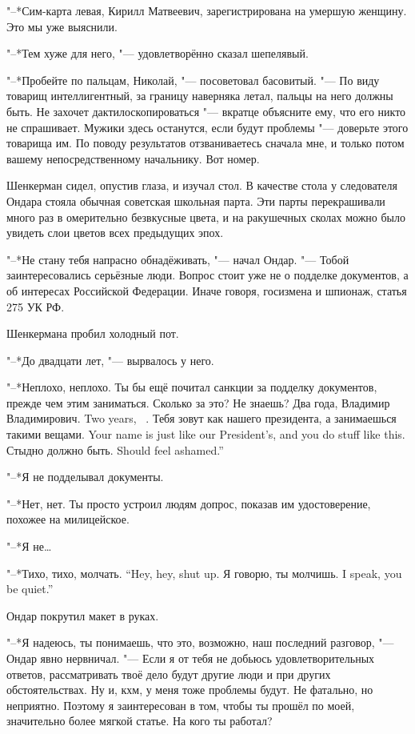 "--*Сим-карта левая, Кирилл Матвеевич, зарегистрирована на умершую женщину.
Это мы уже выяснили.

"--*Тем хуже для него, "--- удовлетворённо сказал шепелявый.

"--*Пробейте по пальцам, Николай, "--- посоветовал басовитый.
"--- По виду товарищ интеллигентный, за границу наверняка летал, пальцы на него должны быть.
Не захочет дактилоскопироваться "--- вкратце объясните ему, что его никто не спрашивает.
Мужики здесь останутся, если будут проблемы "--- доверьте этого товарища им.
По поводу результатов отзваниваетесь сначала мне, и только потом вашему непосредственному начальнику.
Вот номер.

\asterism

Шенкерман сидел, опустив глаза, и изучал стол.
В качестве стола у следователя Ондара стояла обычная советская школьная парта.
Эти парты перекрашивали много раз в омерительно безвкусные цвета, и на ракушечных сколах можно было увидеть слои цветов всех предыдущих эпох.

"--*Не стану тебя напрасно обнадёживать, "--- начал Ондар.
"--- Тобой заинтересовались серьёзные люди.
Вопрос стоит уже не о подделке документов, а об интересах Российской Федерации.
Иначе говоря, госизмена и шпионаж, статья 275 УК РФ.

Шенкермана пробил холодный пот.

"--*До двадцати лет, "--- вырвалось у него.

"--*Неплохо, неплохо.
Ты бы ещё почитал санкции за подделку документов, прежде чем этим заниматься.
Сколько за это?
Не знаешь?
{Два года, Владимир Владимирович.}
{Two years, \Vladimir\ \Vladimirovich.}
{Тебя зовут как нашего президента, а занимаешься такими вещами.}
{Your name is just like our President's, and you do stuff like this.}
{Стыдно должно быть.}
{Should feel ashamed.''}

"--*Я не подделывал документы.

"--*Нет, нет.
Ты просто устроил людям допрос, показав им удостоверение, похожее на милицейское.

"--*Я не\ldots{}

{"--*Тихо, тихо, молчать.}
{``Hey, hey, shut up.}
{Я говорю, ты молчишь.}
{I speak, you be quiet.''}

Ондар покрутил макет в руках.

"--*Я надеюсь, ты понимаешь, что это, возможно, наш последний разговор, "--- Ондар явно нервничал.
"--- Если я от тебя не добьюсь удовлетворительных ответов, рассматривать твоё дело будут другие люди и при других обстоятельствах.
Ну и, кхм, у меня тоже проблемы будут.
Не фатально, но неприятно.
Поэтому я заинтересован в том, чтобы ты прошёл по моей, значительно более мягкой статье.
На кого ты работал?

